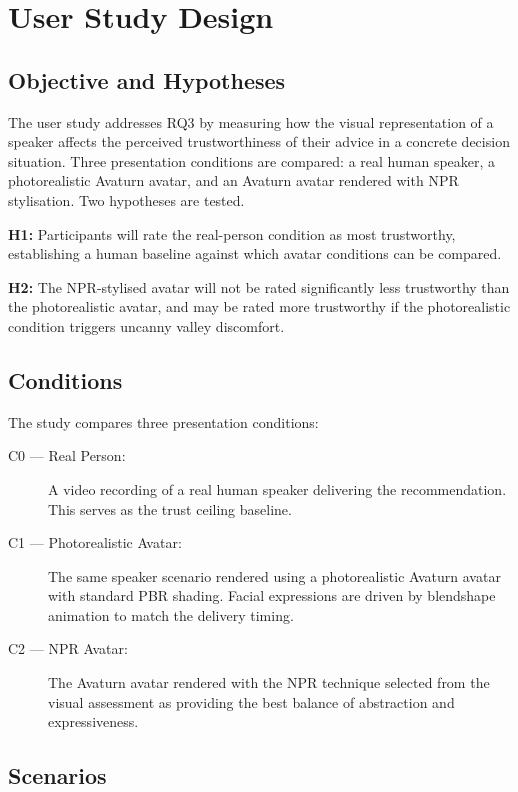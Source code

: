 \section{User Study Design}
\label{sec:user_study}

\subsection{Objective and Hypotheses}
\label{sec:study_objective}

The user study addresses RQ3 by measuring how the visual representation of a speaker affects the perceived trustworthiness of their advice in a concrete decision situation. Three presentation conditions are compared: a real human speaker, a photorealistic Avaturn avatar, and an Avaturn avatar rendered with NPR stylisation. Two hypotheses are tested.

\textbf{H1:} Participants will rate the real-person condition as most trustworthy, establishing a human baseline against which avatar conditions can be compared.

\textbf{H2:} The NPR-stylised avatar will not be rated significantly less trustworthy than the photorealistic avatar, and may be rated more trustworthy if the photorealistic condition triggers uncanny valley discomfort.

\subsection{Conditions}
\label{sec:study_conditions}

The study compares three presentation conditions:

\begin{description}
  \item[C0 — Real Person:] A video recording of a real human speaker delivering the recommendation. This serves as the trust ceiling baseline.
  \item[C1 — Photorealistic Avatar:] The same speaker scenario rendered using a photorealistic Avaturn avatar with standard PBR shading. Facial expressions are driven by blendshape animation to match the delivery timing.
  \item[C2 — NPR Avatar:] The Avaturn avatar rendered with the NPR technique selected from the visual assessment as providing the best balance of abstraction and expressiveness.
\end{description}

\subsection{Scenarios}
\label{sec:study_scenarios}


